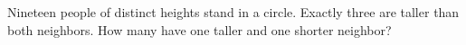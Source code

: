 Nineteen people of distinct heights stand in a circle. Exactly three are taller than both neighbors. How many have one taller and one shorter neighbor?
